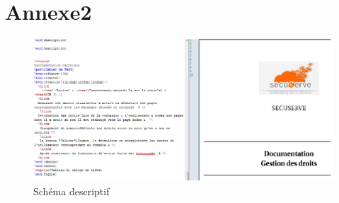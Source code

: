 \section{Annexe2}
\begin{figure}[!h]
\begin{center}
\includegraphics[width=15cm]{image/code_doc_tex.png}
\end{center}
\caption{Schéma descriptif}
\end{figure}